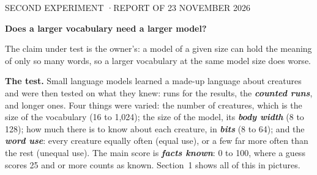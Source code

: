 \documentclass[10pt,letterpaper]{article}
\newcommand{\smallcaps}[1]{{\sffamily\fontsize{7.6}{9}\selectfont\color{second}\addfontfeature{LetterSpace=7}#1}}
\newcommand{\term}[1]{\textbf{\textit{#1}}}      %
\newcommand{\lead}[1]{\textbf{#1}}               %
\begin{document}

\smallcaps{SECOND EXPERIMENT \enspace·\enspace REPORT OF 23 NOVEMBER 2026}\par
\vspace{4pt}
{\sffamily\bfseries\fontsize{21.5}{25}\selectfont Does a larger vocabulary need a larger model?\par}
\vspace{4pt}
{\sffamily\fontsize{10.5}{14}\selectfont\color{second}The claim under test is the owner's: a model of a given
size can hold the meaning of only so many words, so a larger vocabulary at the same model size does
worse.\par}
\vspace{6pt}

\lead{The test.} Small language models learned a made-up language about creatures and were then
tested on what they knew: \RunsCounted{} runs for the results, the \term{counted runs}, and
\RunsLonger{} longer ones. Four things were varied: the number of creatures, which is the size of
the vocabulary (16 to 1,024); the size of the model, its \term{body width} (8 to 128); how much
there is to know about each creature, in \term{bits} (8 to 64); and the \term{word use}: every
creature equally often (equal use), or a few far more often than the rest (unequal use). The main
score is \term{facts known}: 0 to 100, where a guess scores 25 and \KnownBar{} or more counts as
known. Section~1 shows all of this in pictures.
\end{document}
